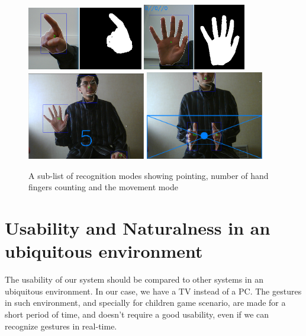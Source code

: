 \documentclass{llncs}
\begin{document}
\begin{figure}[!htb]
\centering
  \includegraphics[width=0.45\textwidth]{./pics/point.png}
  \includegraphics[width=0.4\textwidth]{./pics/simplify.png}
  \includegraphics[width=0.46\textwidth]{./pics/fingers.png}
  \includegraphics[width=0.46\textwidth]{./pics/move.png}
  \caption{A sub-list of recognition modes showing pointing, number of hand
fingers counting and the movement mode}
 \label{fig:Gestes}
\end{figure}


\section{Usability and Naturalness in an ubiquitous environment}

The usability of our system should be compared to other systems in an ubiquitous
environment. In our case, we have a TV instead of a PC.
The gestures in such environment, and specially for children game scenario,
are made for a short period of time, and doesn't require a good usability,
even if we can recognize gestures in real-time.
\end{document}
